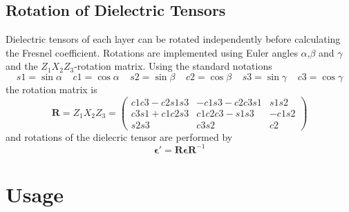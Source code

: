 \documentclass[11pt]{article}
\begin{document}
\subsection{Rotation of Dielectric Tensors}
Dielectric tensors of each layer can be rotated independently before calculating the Fresnel coefficient. Rotations are implemented using Euler angles $\alpha$,$\beta$ and $\gamma$ and the $Z_1X_2Z_3$-rotation matrix. Using the standard notations
\begin{displaymath}
s1= \sin \alpha \;\;\;\; c1= \cos \alpha \;\;\;\; s2= \sin \beta \;\;\;\; c2= \cos \beta \;\;\;\; s3= \sin \gamma \;\;\;\; c3= \cos \gamma
\end{displaymath}
the rotation matrix is 
\begin{equation}
\mathbf{R}=Z_1X_2Z_3=\left(\begin{array}{ccc} c1c3-c2s1s3 & -c1s3-c2c3s1 & s1s2 \\
								   c3s1+c1c2s3 & c1c2c3- s1s3 & -c1s2 \\
								   s2s3 & c3s2 & c2

\end{array}\right)
\end{equation}
and rotations of the dielecric tensor are performed by
\begin{equation}
\mathbf{\epsilon'}=\mathbf{R}\mathbf{\epsilon} \mathbf{R}^{-1}
\end{equation}
\section{Usage}
\end{document}
